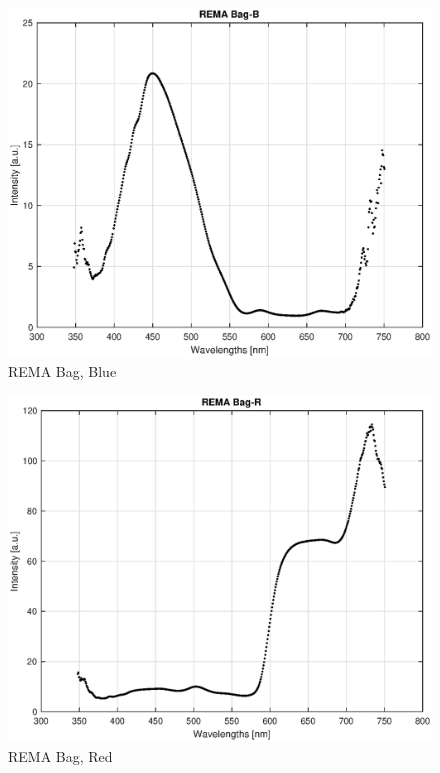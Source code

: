 \begin{appendices}
\begin{figure}
    \centering
    \includegraphics[width = 12cm]{Images/appendix/remablue.eps}
    \caption[$\; \:$REMA Bag, Blue]{REMA Bag, Blue}
    \label{fig:remablue}
\end{figure}

\begin{figure}
    \centering
    \includegraphics[width = 12cm]{Images/appendix/remared.eps}
    \caption[$\; \:$REMA Bag, Red]{REMA Bag, Red}
    \label{fig:remared}
\end{figure}


\end{appendices}
